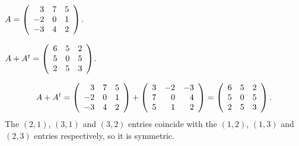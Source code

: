 \documentclass{ximera}
\begin{document}
\begin{exercise} \label{YZ_1.3_sym2}
$A=\Matrix{3&7&5\\-2&0&1\\-3&4&2}$.
\begin{solution}

\ans $A+A^t=\Matrix{6&5&2\\5&0&5\\2&5&3}$.

\soln
\[
A+A^t=\Matrix{3&7&5\\-2&0&1\\-3&4&2}+\Matrix{3&-2&-3\\7&0&4\\5&1&2}=\Matrix{6&5&2\\5&0&5\\2&5&3}.
\]
The $(2,1)$, $(3,1)$ and $(3,2)$ entries coincide with the $(1,2)$, $(1,3)$ and $(2,3)$ entries respectively, so it is symmetric.
\end{solution}
\end{exercise}
\end{document}

